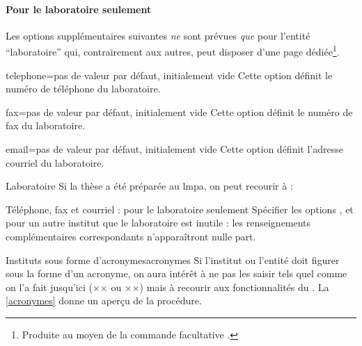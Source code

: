 \paragraph{Pour le laboratoire seulement}

Les options supplémentaires suivantes \emph{ne} sont prévues
\emph{que} pour l'entité \enquote{laboratoire} qui, contrairement
aux autres, peut disposer d'une page dédiée\footnote{Produite au
  moyen de la commande facultative .}.
%
\begin{docKey}{telephone}{=}{pas de valeur par défaut,
    initialement vide}
  Cette option définit le numéro de téléphone du laboratoire.
\end{docKey}
%
\begin{docKey}{fax}{=}{pas de valeur par défaut,
    initialement vide}
  Cette option définit le numéro de fax du laboratoire.
\end{docKey}
\begin{docKey}{email}{=}{pas de valeur par
    défaut, initialement vide}
  Cette option définit l'adresse courriel du laboratoire.
\end{docKey}
%
\begin{dbexample}{Laboratoire}{}
  Si la thèse a été préparée au \gls{lmpa}, on peut recourir à :
  \NoAutoSpacing%
\begin{bodycode}
\end{bodycode}
\end{dbexample}
%
\begin{dbremark}{Téléphone, fax et courriel : pour le
    laboratoire seulement}{}
  Spécifier les options ,  et  pour
  un autre institut que le laboratoire est inutile : les renseignements
  complémentaires correspondants n'apparaîtront nulle part.
\end{dbremark}
%
\begin{dbremark}{Instituts sous forme d'acronymes}{acronymes}
  Si l'institut ou l'entité doit figurer sous la forme d'un
  acronyme, on aura intérêt à ne pas les saisir tels quel comme on
  l'a fait jusqu'ici (×× ou ××)
  mais à recourir aux fonctionnalités du . La
  \vref{acronymes} donne un aperçu de la procédure.
\end{dbremark}

